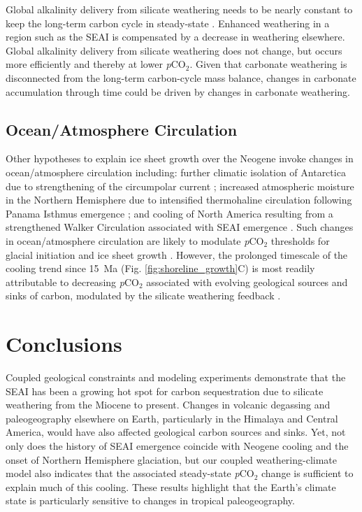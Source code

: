 \documentclass[9pt,twocolumn,twoside,lineno]{pnas-new}
\newcommand{\pCOtwo}{\textit{p}CO$_{2}$\xspace}
\begin{document}
Global alkalinity delivery from silicate weathering needs to be nearly constant to keep the long-term carbon cycle in steady-state \cite{Kump1997a}. Enhanced weathering in a region such as the SEAI is compensated by a decrease in weathering elsewhere. Global alkalinity delivery from silicate weathering does not change, but occurs more efficiently and thereby at lower \pCOtwo. Given that carbonate weathering is disconnected from the long-term carbon-cycle mass balance, changes in carbonate accumulation through time \cite{Si2019a} could be driven by changes in carbonate weathering.

\subsection*{Ocean/Atmosphere Circulation}

Other hypotheses to explain ice sheet growth over the Neogene invoke changes in ocean/atmosphere circulation including: further climatic isolation of Antarctica due to strengthening of the circumpolar current \cite{Shevenell2004a}; increased atmospheric moisture in the Northern Hemisphere due to intensified thermohaline circulation following Panama Isthmus emergence \cite{Haug1998a}; and cooling of North America resulting from a strengthened Walker Circulation associated with SEAI emergence \cite{Molnar2015a}. Such changes in ocean/atmosphere circulation are likely to modulate \pCOtwo thresholds for glacial initiation and ice sheet growth \cite{DeConto2008a}. However, the prolonged timescale of the cooling trend since 15~Ma (Fig. \ref{fig:shoreline_growth}C) is most readily attributable to decreasing \pCOtwo associated with evolving geological sources and sinks of carbon, modulated by the silicate weathering feedback \cite{Walker1981a, Raymo1991a, Berner1997a, Kump1997a, Berner2001a}.

\section*{Conclusions}

Coupled geological constraints and modeling experiments demonstrate that the SEAI has been a growing hot spot for carbon sequestration due to silicate weathering from the Miocene to present. Changes in volcanic degassing and paleogeography elsewhere on Earth, particularly in the Himalaya and Central America, would have also affected geological carbon sources and sinks. Yet, not only does the history of SEAI emergence coincide with Neogene cooling and the onset of Northern Hemisphere glaciation, but our coupled weathering-climate model also indicates that the associated steady-state \pCOtwo change is sufficient to explain much of this cooling. These results highlight that the Earth's climate state is particularly sensitive to changes in tropical paleogeography.
\end{document}
